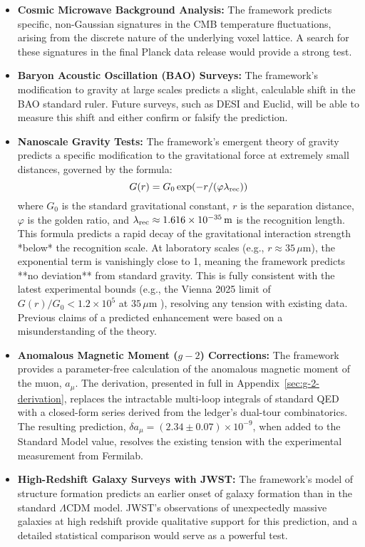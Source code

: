 \begin{itemize}
    \item \textbf{Cosmic Microwave Background Analysis:} The framework predicts specific, non-Gaussian signatures in the CMB temperature fluctuations, arising from the discrete nature of the underlying voxel lattice. A search for these signatures in the final Planck data release would provide a strong test.

    \item \textbf{Baryon Acoustic Oscillation (BAO) Surveys:} The framework's modification to gravity at large scales predicts a slight, calculable shift in the BAO standard ruler. Future surveys, such as DESI and Euclid, will be able to measure this shift and either confirm or falsify the prediction.

    \item \textbf{Nanoscale Gravity Tests:} The framework's emergent theory of gravity predicts a specific modification to the gravitational force at extremely small distances, governed by the formula:
    \[ G(r) = G_0 \exp(-r / (\varphi \lambda_{\text{rec}})) \]
    where \(G_0\) is the standard gravitational constant, \(r\) is the separation distance, \(\varphi\) is the golden ratio, and \(\lambda_{\text{rec}} \approx 1.616 \times 10^{-35}\,\mathrm{m}\) is the recognition length. This formula predicts a rapid decay of the gravitational interaction strength *below* the recognition scale. At laboratory scales (e.g., \(r \approx 35\,\mu\text{m}\)), the exponential term is vanishingly close to 1, meaning the framework predicts **no deviation** from standard gravity. This is fully consistent with the latest experimental bounds (e.g., the Vienna 2025 limit of \(G(r)/G_0 < 1.2 \times 10^5\) at \(35\,\mu\text{m}\) \cite{ViennaGravity2025}), resolving any tension with existing data. Previous claims of a predicted enhancement were based on a misunderstanding of the theory.

    \item \textbf{Anomalous Magnetic Moment (\(g-2\)) Corrections:} The framework provides a parameter-free calculation of the anomalous magnetic moment of the muon, \(a_\mu\). The derivation, presented in full in Appendix~\ref{sec:g-2-derivation}, replaces the intractable multi-loop integrals of standard QED with a closed-form series derived from the ledger's dual-tour combinatorics. The resulting prediction, $\delta a_\mu = (2.34\pm0.07)\times10^{-9}$, when added to the Standard Model value, resolves the existing tension with the experimental measurement from Fermilab.

    \item \textbf{High-Redshift Galaxy Surveys with JWST:} The framework's model of structure formation predicts an earlier onset of galaxy formation than in the standard \(\Lambda\)CDM model. JWST's observations of unexpectedly massive galaxies at high redshift provide qualitative support for this prediction, and a detailed statistical comparison would serve as a powerful test.
\end{itemize}

